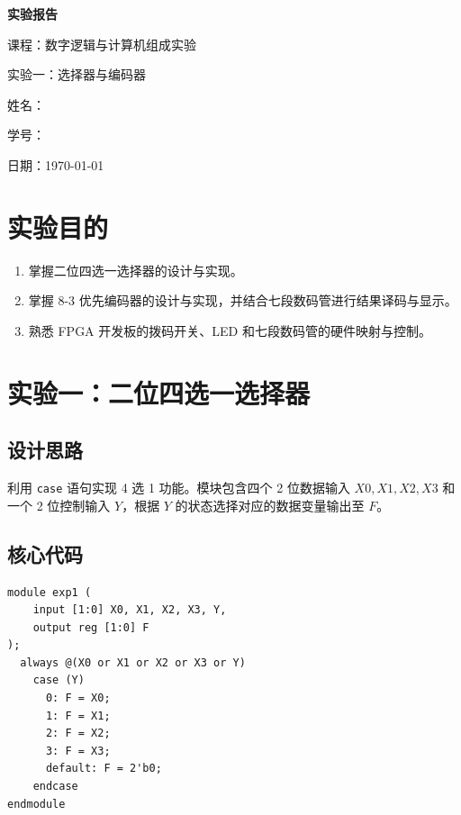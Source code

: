 \documentclass[12pt, a4paper]{ctexart}
\begin{document}
\begin{titlepage}
    \centering
    \vspace*{5cm}
    {\Huge\bfseries 实验报告\par}
    \vspace{2cm}
    {\Large 课程：数字逻辑与计算机组成实验\par}
    \vspace{1cm}
    {\Large 实验一：选择器与编码器\par}
    \vspace{4cm}
    {\large 姓名：\underline{}\par}
    \vspace{1cm}
    {\large 学号：\underline{}\par}
    \vspace{1cm}
    {\large 日期：\today\par}
\end{titlepage}

\tableofcontents
\newpage

\section{实验目的}
\begin{enumerate}
    \item 掌握二位四选一选择器的设计与实现。
    \item 掌握 8-3 优先编码器的设计与实现，并结合七段数码管进行结果译码与显示。
    \item 熟悉 FPGA 开发板的拨码开关、LED 和七段数码管的硬件映射与控制。
\end{enumerate}

\section{实验一：二位四选一选择器}
\subsection{设计思路}
利用 \texttt{case} 语句实现 4 选 1 功能。模块包含四个 2 位数据输入 $X0, X1, X2, X3$ 和一个 2 位控制输入 $Y$，根据 $Y$ 的状态选择对应的数据变量输出至 $F$。

\subsection{核心代码}
\begin{lstlisting}
module exp1 (
    input [1:0] X0, X1, X2, X3, Y,
    output reg [1:0] F
);
  always @(X0 or X1 or X2 or X3 or Y)
    case (Y)
      0: F = X0;
      1: F = X1;
      2: F = X2;
      3: F = X3;
      default: F = 2'b0;
    endcase
endmodule
\end{lstlisting}
\end{document}
